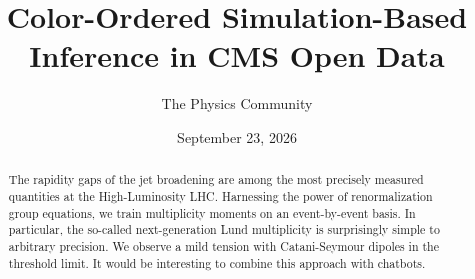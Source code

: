 \documentclass[11pt]{article}
\title{Color-Ordered Simulation-Based Inference in CMS Open Data}
\author{The Physics Community}
\date{September 23, 2026}
\begin{document}
\maketitle
\begin{abstract}
The rapidity gaps of the jet broadening are among the most precisely
measured quantities at the High-Luminosity LHC. Harnessing the power of
renormalization group equations, we train multiplicity moments on an
event-by-event basis. In particular, the so-called next-generation Lund
multiplicity is surprisingly simple to arbitrary precision. We observe a
mild tension with Catani-Seymour dipoles in the threshold limit. It
would be interesting to combine this approach with chatbots.
\end{abstract}
\tableofcontents






\nocite{*}


\end{document}
